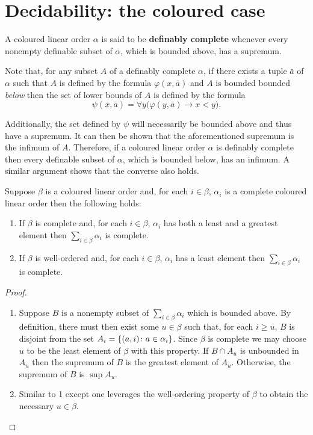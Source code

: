\section{Decidability: the coloured case}

\begin{dfn}
	A coloured linear order $\alpha$ is said to be \textbf{definably complete} whenever every nonempty definable subset of $\alpha$, which is bounded above, has a supremum.
\end{dfn}

Note that, for any subset $A$ of a definably complete $\alpha$, if there exists a tuple $\bar{a}$ of $\alpha$ such that $A$ is defined by the formula $\varphi(x,\bar{a})$ and $A$ is bounded bounded \textit{below} then the set of lower bounds of $A$ is defined by the formula
\begin{equation}
	\psi(x,\bar{a})=\forall y\big(\varphi(y,\bar{a})\rightarrow x<y\big).
\end{equation}

Additionally, the set defined by $\psi$ will necessarily be bounded above and thus have a supremum.  It can then be shown that the aforementioned supremum is the infimum of $A$.  Therefore, if a coloured linear order $\alpha$ is definably complete then every definable subset of $\alpha$, which is bounded below, has an infimum.  A similar argument shows that the converse also holds.

\begin{lem}\label{lem:compsum}
	Suppose $\beta$ is a coloured linear order and, for each $i\in\beta$, $\alpha_i$ is a complete coloured linear order then the following holds:
	\begin{enumerate}
		\item	If $\beta$ is complete and, for each $i\in\beta$, $\alpha_i$ has both a least and a greatest element then $\sum_{i\in\beta}\alpha_i$ is complete.
		\item	If $\beta$ is well-ordered and, for each $i\in\beta$, $\alpha_i$ has a least element then $\sum_{i\in\beta}\alpha_i$ is complete.
	\end{enumerate}
\end{lem}
\begin{proof}
	\begin{enumerate}[nosep]
		\item	Suppose $B$ is a nonempty subset of $\sum_{i\in\beta}\alpha_i$ which is bounded above.  By definition, there must then exist some $u\in\beta$ such that, for each $i\geq u$, $B$ is disjoint from the set $A_i=\left\lbrace (a,i)\colon a\in\alpha_i \right\rbrace$.  Since $\beta$ is complete we may choose $u$ to be the least element of $\beta$ with this property.  If $B\cap A_u$ is unbounded in $A_u$ then the supremum of $B$ is the greatest element of $A_u$.  Otherwise, the supremum of $B$ is $\sup A_u$.
		\item	Similar to 1 except one leverages the well-ordering property of $\beta$ to obtain the necessary $u\in\beta$.\qedhere
	\end{enumerate}
\end{proof}

